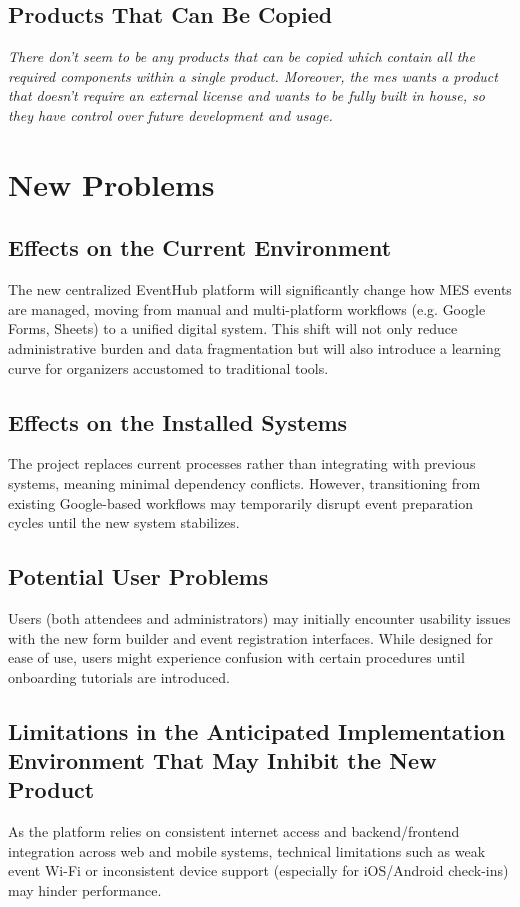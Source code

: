 \documentclass[12pt]{article}
\begin{document}
\subsection{Products That Can Be Copied}
\textit{There don't seem to be any products that can be copied which contain all the required components within a single
product. Moreover, the \gls{mes} wants a product that doesn't require an external license and wants to be fully built in
house, so they have control over future development and usage.}

\section{New Problems}

\subsection{Effects on the Current Environment}
The new centralized EventHub platform will significantly change how MES events are managed, moving from manual and multi-platform workflows (e.g. Google Forms, Sheets) to a unified digital system. This shift will not only reduce administrative burden and data fragmentation but will also introduce a learning curve for organizers accustomed to traditional tools.

\subsection{Effects on the Installed Systems}
The project replaces current processes rather than integrating with previous systems, meaning minimal dependency conflicts. However, transitioning from existing Google-based workflows may temporarily disrupt event preparation cycles until the new system stabilizes. 

\subsection{Potential User Problems}
Users (both attendees and administrators) may initially encounter usability issues with the new form builder and event registration interfaces. While designed for ease of use, users might experience confusion with certain procedures until onboarding tutorials are introduced. 

\subsection{Limitations in the Anticipated Implementation Environment That May
Inhibit the New Product}
As the platform relies on consistent internet access and backend/frontend integration across web and mobile systems, technical limitations such as weak event Wi-Fi or inconsistent device support (especially for iOS/Android check-ins) may hinder performance. 
\end{document}
